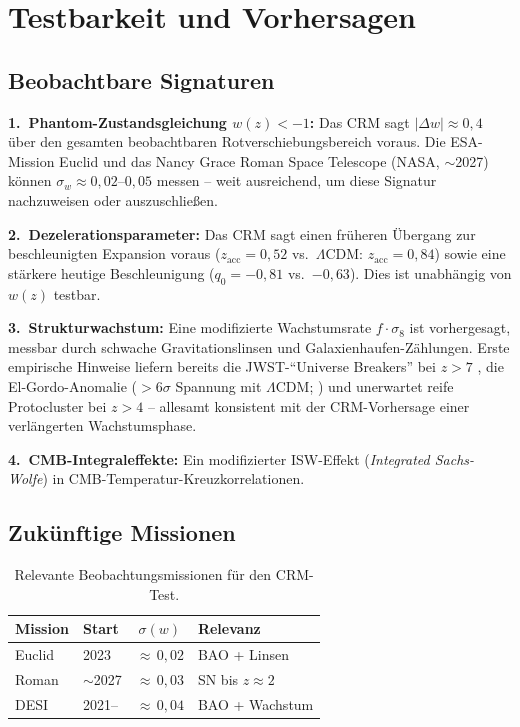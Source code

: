 \documentclass[aps,prd,twocolumn,superscriptaddress,nofootinbib]{revtex4-2}
\begin{document}
\section{Testbarkeit und Vorhersagen}
\label{sec:testbarkeit}

\subsection{Beobachtbare Signaturen}

\textbf{1.~Phantom-Zustandsgleichung $w(z) < -1$:} Das CRM sagt $|\Delta w| \approx 0{,}4$ \"uber den gesamten beobachtbaren Rotverschiebungsbereich voraus. Die ESA-Mission Euclid \cite{Euclid2024} und das Nancy Grace Roman Space Telescope (NASA, $\sim$2027) k\"onnen $\sigma_w \approx 0{,}02$--$0{,}05$ messen -- weit ausreichend, um diese Signatur nachzuweisen oder auszuschlie\ss{}en.

\textbf{2.~Dezelerationsparameter:} Das CRM sagt einen fr\"uheren \"Ubergang zur beschleunigten Expansion voraus ($z_{\mathrm{acc}} = 0{,}52$ vs.\ $\Lambda$CDM: $z_{\mathrm{acc}} = 0{,}84$) sowie eine st\"arkere heutige Beschleunigung ($q_0 = -0{,}81$ vs.\ $-0{,}63$). Dies ist unabh\"angig von $w(z)$ testbar.

\textbf{3.~Strukturwachstum:} Eine modifizierte Wachstumsrate $f \cdot \sigma_8$ ist vorhergesagt, messbar durch schwache Gravitationslinsen und Galaxienhaufen-Z\"ahlungen. Erste empirische Hinweise liefern bereits die JWST-``Universe Breakers'' bei $z > 7$ \cite{Labbe2023}, die El-Gordo-Anomalie ($> 6\sigma$ Spannung mit $\Lambda$CDM; \cite{Asencio2023}) und unerwartet reife Protocluster bei $z > 4$ \cite{Miller2018} -- allesamt konsistent mit der CRM-Vorhersage einer verl\"angerten Wachstumsphase.

\textbf{4.~CMB-Integraleffekte:} Ein modifizierter ISW-Effekt (\textit{Integrated Sachs-Wolfe}) in CMB-Temperatur-Kreuzkorrelationen.

\subsection{Zuk\"unftige Missionen}

\begin{table}[H]
\centering
\caption{Relevante Beobachtungsmissionen f\"ur den CRM-Test.}
\label{tab:missionen}
\small
\begin{tabular}{llcl}
\toprule
\textbf{Mission} & \textbf{Start} & $\sigma(w)$ & \textbf{Relevanz} \\
\midrule
Euclid & 2023 & ${\approx}\,0{,}02$ & BAO + Linsen \\
Roman & ${\sim}$2027 & ${\approx}\,0{,}03$ & SN bis $z \approx 2$ \\
DESI & 2021-- & ${\approx}\,0{,}04$ & BAO + Wachstum \\
\bottomrule
\end{tabular}
\end{table}
\end{document}
